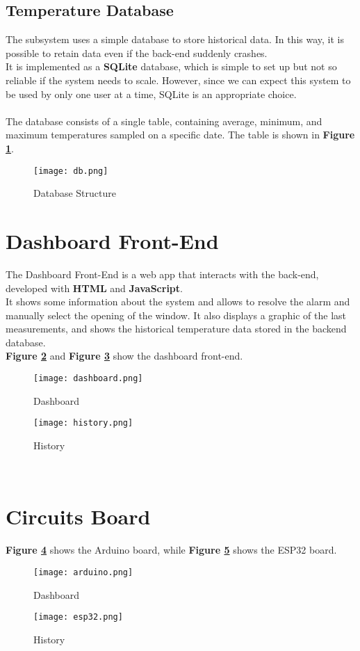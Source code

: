 \documentclass{article}
\begin{document}
\subsection{Temperature Database}
The subsystem uses a simple database to store historical data. In this way, it is possible to retain data even if the back-end suddenly crashes.\\
It is implemented as a \textbf{SQLite} database, which is simple to set up but not so reliable if the system needs to scale. However, since we can expect this system to be used by only one user at a time, SQLite is an appropriate choice.\\
\\
The database consists of a single table, containing average, minimum, and maximum temperatures sampled on a specific date. The table is shown in \textbf{Figure \ref{fig:db}}.
\begin{figure}[htp]
    \centering
    \texttt{[image: db.png]}
    \caption{Database Structure}
    \label{fig:db}
\end{figure}

\section{Dashboard Front-End}
The Dashboard Front-End is a web app that interacts with the back-end, developed with \textbf{HTML} and \textbf{JavaScript}.\\
It shows some information about the system and allows to resolve the alarm and manually select the opening of the window. It also displays a graphic of the last measurements, and shows the historical temperature data stored in the backend database.\\
\textbf{Figure \ref{fig:dashboard}} and \textbf{Figure \ref{fig:history}} show the dashboard front-end. 
\begin{figure}[htp]
    \centering
    \texttt{[image: dashboard.png]}
    \caption{Dashboard}
    \label{fig:dashboard}
\end{figure}
\begin{figure}[htp]
    \centering
    \texttt{[image: history.png]}
    \caption{History}
    \label{fig:history}
\end{figure}
\\
\section{Circuits Board}
\textbf{Figure \ref{fig:arduino}} shows the Arduino board, while \textbf{Figure \ref{fig:esp32}} shows the ESP32 board.
\begin{figure}[htp]
    \centering
    \texttt{[image: arduino.png]}
    \caption{Dashboard}
    \label{fig:arduino}
\end{figure}
\begin{figure}[htp]
    \centering
    \texttt{[image: esp32.png]}
    \caption{History}
    \label{fig:esp32}
\end{figure}
\end{document}
